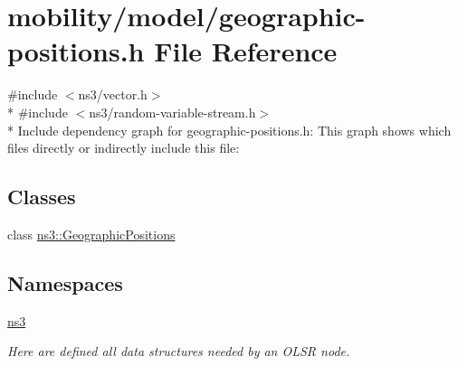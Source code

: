 \hypertarget{geographic-positions_8h}{}\section{mobility/model/geographic-\/positions.h File Reference}
\label{geographic-positions_8h}
{\ttfamily \#include $<$ns3/vector.\+h$>$}\\*
{\ttfamily \#include $<$ns3/random-\/variable-\/stream.\+h$>$}\\*
Include dependency graph for geographic-\/positions.h\+:
This graph shows which files directly or indirectly include this file\+:
\subsection*{Classes}
\begin{DoxyCompactItemize}
\item 
class \hyperlink{classns3_1_1GeographicPositions}{ns3\+::\+Geographic\+Positions}
\end{DoxyCompactItemize}
\subsection*{Namespaces}
\begin{DoxyCompactItemize}
\item 
 \hyperlink{namespacens3}{ns3}
\begin{DoxyCompactList}\small\item\em Here are defined all data structures needed by an O\+L\+SR node. \end{DoxyCompactList}\end{DoxyCompactItemize}
